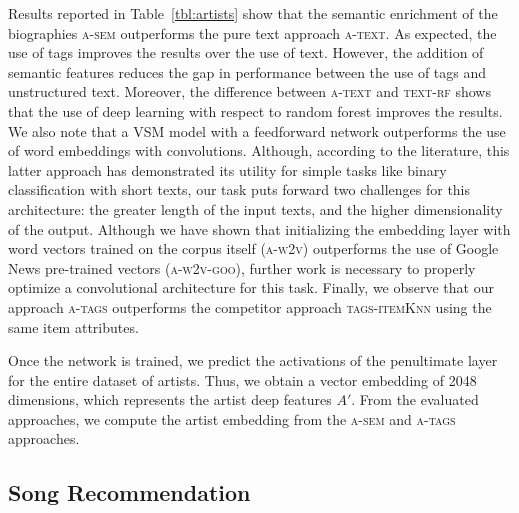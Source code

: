Results reported in Table~\ref{tbl:artists} show that the semantic enrichment of the biographies \textsc{a-sem} outperforms the pure text approach \textsc{a-text}. As expected, the use of tags improves the results over the use of text. However, the addition of semantic features reduces the gap in performance between the use of tags and unstructured text. Moreover, the difference between \textsc{a-text} and \textsc{text-rf} shows that the use of deep learning with respect to random forest improves the results. We also note that a VSM model with a feedforward network outperforms the use of word embeddings with convolutions. Although, according to the literature, this latter approach has demonstrated its utility for simple tasks like binary classification with short texts, our task puts forward two challenges for this architecture: the greater length of the input texts, and the higher dimensionality of the output. Although we have shown that initializing the embedding layer with word vectors trained on the corpus itself (\textsc{a-w2v}) outperforms the use of Google News pre-trained vectors (\textsc{a-w2v-goo}), further work is necessary to properly optimize a convolutional architecture for this task. Finally, we observe that our approach \textsc{a-tags} outperforms the competitor approach \textsc{tags-itemKnn} using the same item attributes.

Once the network is trained, we predict the activations of the penultimate layer for the entire dataset of artists. Thus, we obtain a vector embedding of 2048 dimensions, which represents the artist deep features $A'$. From the evaluated approaches, we compute the artist embedding from the \textsc{a-sem} and \textsc{a-tags} approaches.

\subsection{Song Recommendation}
\label{sec:cold-rec:song-rec}


